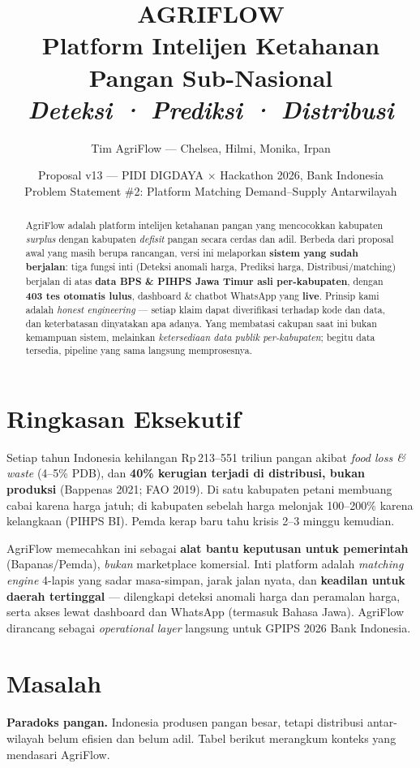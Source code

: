 \documentclass[11pt,a4paper]{article}
\title{\textbf{\color{agrigreen}AGRIFLOW} \\[2pt]
\large Platform Intelijen Ketahanan Pangan Sub-Nasional \\[4pt]
\normalsize \emph{Deteksi · Prediksi · Distribusi}}
\author{Tim AgriFlow --- Chelsea, Hilmi, Monika, Irpan}
\date{Proposal v13 --- PIDI DIGDAYA $\times$ Hackathon 2026, Bank Indonesia \\
Problem Statement \#2: Platform Matching Demand--Supply Antarwilayah}
\newcommand{\rp}{Rp\,}
\begin{document}
\maketitle
\thispagestyle{empty}

\begin{abstract}
\noindent
AgriFlow adalah platform intelijen ketahanan pangan yang mencocokkan kabupaten \emph{surplus}
dengan kabupaten \emph{defisit} pangan secara cerdas dan adil. Berbeda dari proposal awal yang
masih berupa rancangan, versi ini melaporkan \textbf{sistem yang sudah berjalan}: tiga fungsi
inti (Deteksi anomali harga, Prediksi harga, Distribusi/matching) berjalan di atas \textbf{data
BPS \& PIHPS Jawa Timur asli per-kabupaten}, dengan \textbf{403 tes otomatis lulus}, dashboard
\& chatbot WhatsApp yang \textbf{live}. Prinsip kami adalah \emph{honest engineering} --- setiap
klaim dapat diverifikasi terhadap kode dan data, dan keterbatasan dinyatakan apa adanya. Yang
membatasi cakupan saat ini bukan kemampuan sistem, melainkan \emph{ketersediaan data publik
per-kabupaten}; begitu data tersedia, pipeline yang sama langsung memprosesnya.
\end{abstract}

\section{Ringkasan Eksekutif}
Setiap tahun Indonesia kehilangan \rp 213--551 triliun pangan akibat \emph{food loss \& waste}
(4--5\% PDB), dan \textbf{40\% kerugian terjadi di distribusi, bukan produksi} (Bappenas 2021;
FAO 2019). Di satu kabupaten petani membuang cabai karena harga jatuh; di kabupaten sebelah
harga melonjak 100--200\% karena kelangkaan (PIHPS BI). Pemda kerap baru tahu krisis 2--3 minggu
kemudian.

AgriFlow memecahkan ini sebagai \textbf{alat bantu keputusan untuk pemerintah} (Bapanas/Pemda),
\emph{bukan} marketplace komersial. Inti platform adalah \emph{matching engine} 4-lapis yang
sadar masa-simpan, jarak jalan nyata, dan \textbf{keadilan untuk daerah tertinggal} --- dilengkapi
deteksi anomali harga dan peramalan harga, serta akses lewat dashboard dan WhatsApp (termasuk
Bahasa Jawa). AgriFlow dirancang sebagai \emph{operational layer} langsung untuk GPIPS 2026
Bank Indonesia.

\section{Masalah}
\textbf{Paradoks pangan.} Indonesia produsen pangan besar, tetapi distribusi antar-wilayah belum
efisien dan belum adil. Tabel berikut merangkum konteks yang mendasari AgriFlow.
\end{document}
